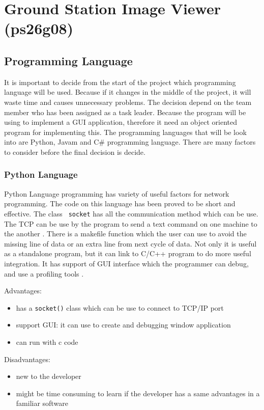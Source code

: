 \section{Ground Station Image Viewer (ps26g08)}

\subsection{Programming Language}

It is important to decide from the start of the project which programming language will be used.
Because if it changes in the middle of the project, it will waste time and causes unnecessary problems.
The decision depend on the team member who has been assigned as a task leader.
Because the program will be using to implement a GUI application, therefore it need an object oriented program for implementing this.
The programming languages that will be look into are Python, Javam and C\# programming language.
There are many factors to consider before the final decision is decide.

\subsubsection*{Python Language}
Python Language programming has variety of useful factors for network programming. 
The code on this language has been proved to be short and effective.
The class \texttt{ socket} has all the communication method which can be use. 
The TCP can be use by the program to send a text command on one machine to the another \cite{normanM}. 
There is a makefile function which the user can use to avoid the missing line of data or an extra line from next cycle of data\cite{normanM,guidoR}. Not only it is useful as a standalone program, but it can link to C/C++ program to do more useful integration.
It has support of GUI interface which the programmer can debug, and use a profiling tools \cite{sannerM}. 

Advantages:
\begin{itemize}
\item has a \texttt{socket()} class which can be use to connect to TCP/IP port
\item support GUI: it can use to create and debugging window application
\item can run with c code
\end{itemize}

Disadvantages:
\begin{itemize}
\item new to the developer
\item might be time consuming to learn if the developer has a same advantages in a familiar software
\end{itemize}

